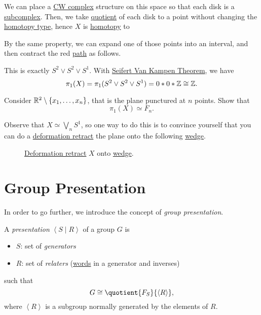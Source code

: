 \begin{explanation}
	We can place a \hyperref[def:CW-Complex]{CW complex} structure on this
	space so that each disk is a \hyperref[def:CW-subcomplex]{subcomplex}. Then, we take \hyperref[CW-complex-quotient]{quotient} of each disk
	to a point without changing the \hyperref[def:homotopy-type]{homotopy type}, hence \(X\) is \hyperref[def:homotopy]{homotopy} to
	\begin{figure}[H]
		\centering
		\label{fig:lec11:eg-3:2}
	\end{figure}
	By the same property, we can expand one of those points into an interval, and then contract the red \hyperref[def:path]{path} as follows.
	\begin{figure}[H]
		\centering
		\label{fig:lec11:eg-3:3}
	\end{figure}
	This is exactly \(S^{2} \vee S^{2} \vee S^1\). With \hyperref[thm:Seifert-Van-Kampen-Theorem]{Seifert Van Kampen Theorem}, we have
	\[
		\pi _1(X) = \pi _1(S^{2} \vee S^{2} \vee S^1) = 0\ast 0\ast \mathbb{\MakeUppercase{z}} \cong \mathbb{\MakeUppercase{z}}.
	\]
\end{explanation}
\begin{exercise}
	Consider \(\mathbb{\MakeUppercase{r}} ^2 \setminus \{x_1, \ldots , x_n \}\), that is the plane punctured at \(n\) points. Show that
	\[
		\pi _1(X)\simeq F_n.
	\]
\end{exercise}
\begin{answer}
	Observe that \(X \simeq \bigvee_n S^1\), so one way to do this is to convince yourself that you can do a
	\hyperref[def:deformation-retraction]{deformation retract} the plane onto the following \hyperref[CW-complex-wedge-sum]{wedge}.
	\begin{figure}[H]
		\centering
		\caption{\hyperref[def:deformation-retraction]{Deformation retract} \(X\) onto \hyperref[CW-complex-wedge-sum]{wedge}.}
		\label{fig:lec11:ex}
	\end{figure}
\end{answer}

\section{Group Presentation}
In order to go further, we introduce the concept of \emph{group presentation}.
\begin{definition}\label{def:group-presentation}
	A \emph{presentation} \(\left< S \mid R \right> \) of a group \(G\) is
	\begin{itemize}
		\item \(S\): set of \emph{generators}
		\item \(R\): set of \emph{relaters} (\hyperref[def:word]{words} in a generator and inverses)
	\end{itemize}
	such that
	\[
		G\cong \quotient{F_S}{\left< R \right>},
	\]
	where \(\left< R \right> \) is a subgroup normally generated by the elements of \(R\).
\end{definition}

